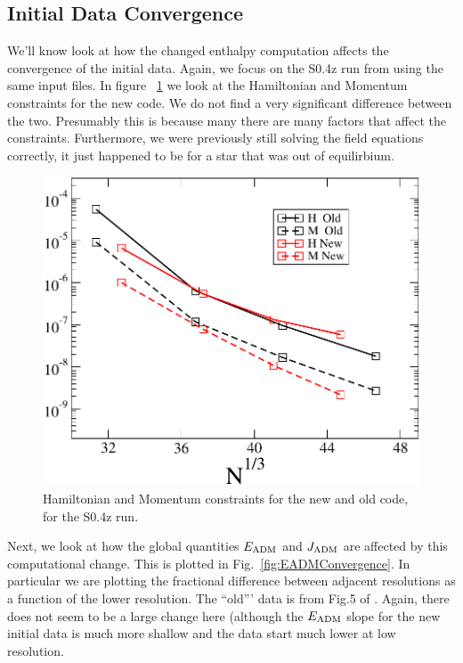 \subsection{Initial Data Convergence}
We'll know look at how the changed enthalpy computation affects the convergence of the initial data. Again, we focus on the S0.4z run from \cite{Tacik:2015tja} using the same input files. In figure ~\ref{fig:NewS4HamMom} we look at the Hamiltonian and Momentum constraints for the new code. We do not find a very significant difference between the two. Presumably this is because many there are many factors that affect the constraints. Furthermore, we were previously still solving the field equations correctly, it just happened to be for a star that was out of equilirbium.

\begin{figure}[!ht]
\includegraphics[width=0.95\columnwidth]{chap6/NewHamMom}
\caption{\label{fig:NewS4HamMom} Hamiltonian and Momentum constraints
  for the new and old code, for the S0.4z run.}
\end{figure}

Next, we look at how the global quantities $E_{\rm ADM}$ and $J_{\rm
  ADM}$ are affected by this computational change. This is plotted in
Fig.~\ref{fig:EADMConvergence}. In particular we are plotting the
fractional difference between adjacent resolutions as a function of
the lower resolution. The ``old''' data is from Fig.5 of \cite{Tacik:2015tja}. Again, there does not seem to be a
large change here (although the $E_{\rm ADM}$ slope for the new
initial data is much more shallow and the data start much lower at low resolution.

